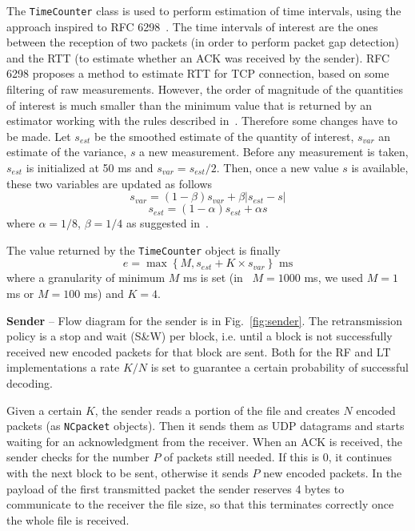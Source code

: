 The \texttt{TimeCounter} class is used to perform estimation of time intervals, using the approach inspired to RFC 6298~\cite{rfc6298}. The time intervals of interest are the ones between the reception of two packets (in order to perform packet gap detection) and the RTT (to estimate whether an ACK was received by the sender). RFC 6298 proposes a method to estimate RTT for TCP connection, based on some filtering of raw measurements. However, the order of magnitude of the quantities of interest is much smaller than the minimum value that is returned by an estimator working with the rules described in~\cite{rfc6298}. Therefore some changes have to be made. Let $s_{est}$ be the smoothed estimate of the quantity of interest, $s_{var}$ an estimate of the variance, $s$ a new measurement. Before any measurement is taken, $s_{est}$ is initialized at 50 ms and $s_{var} = s_{est}/2$. Then, once a new value $s$ is available, these two variables are updated as follows
\begin{equation}
	s_{var} = (1-\beta) s_{var}  + \beta |s_{est} - s|
\end{equation}
\begin{equation}
	s_{est} = (1 - \alpha) s_{est} + \alpha s
\end{equation}
where $\alpha = 1/8$, $\beta = 1/4$ as suggested in~\cite{rfc6298}.

The value returned by the \texttt{TimeCounter} object is finally
\begin{equation}
	e = \max\left\{M, s_{est} + K\times s_{var}  \right\} \mbox{ ms}
\end{equation}
where a granularity of minimum $M$ ms is set (in~\cite{rfc6298} $M = 1000$ ms, we used $M = 1$ ms or $M=100$ ms) and $K = 4$. 

\textbf{Sender} -- Flow diagram for the sender is in Fig.~\ref{fig:sender}. The retransmission policy is a stop and wait (S\&W) per block, i.e. until a block is not successfully received new encoded packets for that block are sent. Both for the RF and LT implementations a rate $K/N$ is set to guarantee a certain probability of successful decoding. 

Given a certain $K$, the sender reads a portion of the file and creates $N$ encoded packets (as \texttt{NCpacket} objects). Then it sends them as UDP datagrams and starts waiting for an acknowledgment from the receiver. When an ACK is received, the sender checks for the number $P$ of packets still needed. If this is 0, it continues with the next block to be sent, otherwise it sends $P$ new encoded packets. In the payload of the first transmitted packet the sender reserves 4 bytes to communicate to the receiver the file size, so that this terminates correctly once the whole file is received. 

